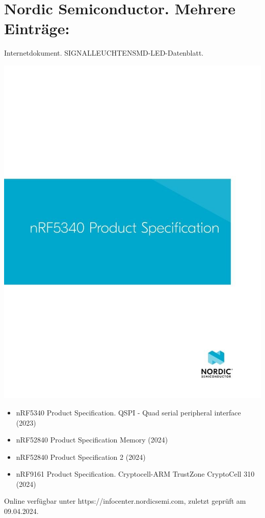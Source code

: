 \section*{Nordic Semiconductor. Mehrere Einträge:}
Internetdokument. SIGNALLEUCHTENSMD-LED-Datenblatt. \\
\begin{minipage}{0.5\textwidth}
	\includegraphics[width=\linewidth]{../Appendix/Literaturverzeichnis/img/Nordic.jpg}
\end{minipage}
\hfill
\begin{minipage}{0.48\textwidth}
\begin{itemize}
	\item nRF5340 Product Specification. QSPI - Quad serial peripheral interface (2023)
	\item nRF52840 Product Specification Memory (2024)
	\item nRF52840 Product Specification 2 (2024)
	\item nRF9161 Product Specification. Cryptocell-ARM TrustZone CryptoCell 310 (2024)
\end{itemize}
Online verfügbar unter https://infocenter.nordicsemi.com, zuletzt geprüft am 09.04.2024.
\end{minipage}

